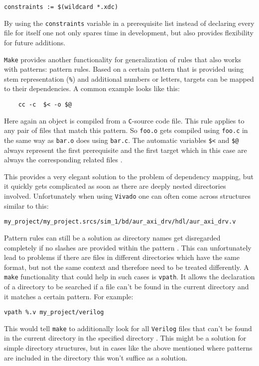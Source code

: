\begin{lstlisting}[language={[gnu] make}]
constraints := $(wildcard *.xdc)
\end{lstlisting}
\noindent
By using the \texttt{constraints} variable in a prerequisite list instead of declaring every file for itself one not only spares time in development, but also provides flexibility for future additions.

\texttt{Make} provides another functionality for generalization of rules that also works with patterns: pattern rules. Based on a certain pattern that is provided using stem representation (\texttt{\%}) and additional numbers or letters, targets can be mapped to their dependencies. A common example looks like this:
\begin{lstlisting}[language={[gnu] make}]
%.o: %.c 
	cc -c  $< -o $@
\end{lstlisting}
\noindent
Here again an object is compiled from a \texttt{C}-source code file. This rule applies to any pair of files that match this pattern. So \texttt{foo.o} gets compiled using \texttt{foo.c} in the same way as \texttt{bar.o} does using \texttt{bar.c}. The automatic variables \texttt{\$<} and \texttt{\$@} always represent the first prerequisite and the first target which in this case are always the corresponding related files \cite[see][p. 119 and p.123]{Make16}. 

This provides a very elegant solution to the problem of dependency mapping, but it quickly gets complicated as soon as there are deeply nested directories involved. Unfortunately when using \texttt{Vivado} one can often come across structures similar to this:
\begin{lstlisting}
my_project/my_project.srcs/sim_1/bd/aur_axi_drv/hdl/aur_axi_drv.v
\end{lstlisting}
\noindent
Pattern rules can still be a solution as directory names get disregarded completely if no slashes are provided within the pattern \cite[see][p. 123]{Make16}. This can unfortunately lead to problems if there are files in different directories which have the same format, but not the same context and therefore need to be treated differently. A \texttt{make} functionality that could help in such cases is \texttt{vpath}. It allows the declaration of a directory to be searched if a file can't be found in the current directory and it matches a certain pattern. For example:
\begin{lstlisting}[language={[gnu] make}]
vpath %.v my_project/verilog
\end{lstlisting}
\noindent
This would tell \texttt{make} to additionally look for all \texttt{Verilog} files that can't be found in the current directory in the specified directory \cite[see][p. 26]{Make16}. This might be a solution for simple directory structures, but in cases like the above mentioned where patterns are included in the directory this won't suffice as a solution.

